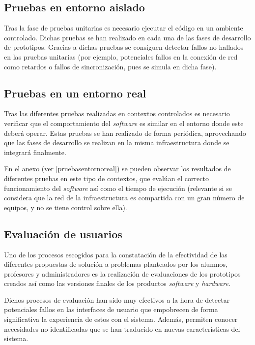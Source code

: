 \subsection{Pruebas en entorno aislado}

Tras la fase de pruebas unitarias es necesario ejecutar el código en un ambiente controlado. Dichas pruebas se han realizado en cada una de las fases de desarrollo de prototipos. Gracias a dichas pruebas se consiguen detectar fallos no hallados en las pruebas unitarias (por ejemplo, potenciales fallos en la conexión de red como retardos o fallos de sincronización, pues se simula en dicha fase).

\subsection{Pruebas en un entorno real}

Tras las diferentes pruebas realizadas en contextos controlados es necesario verificar que el comportamiento del \textit{software} es similar en el entorno donde este deberá operar. Estas pruebas se han realizado de forma periódica, aprovechando que las fases de desarrollo se realizan en la misma infraestructura donde se integrará finalmente.

En el anexo  (ver \ref{pruebasentornoreal}) se pueden observar los resultados de diferentes pruebas en este tipo de contextos, que evalúan el correcto funcionamiento del \textit{software} así como el tiempo de ejecución (relevante si se considera que la red de la infraestructura es compartida con un gran número de equipos, y no se tiene control sobre ella).

\subsection{Evaluación de usuarios}

Uno de los procesos escogidos para la constatación de la efectividad de las diferentes propuestas de solución a problemas planteados por los alumnos, profesores y administradores es la realización de evaluaciones de los prototipos creados así como las versiones finales de los productos \textit{software} y \textit{hardware}.

Dichos procesos de evaluación han sido muy efectivos a la hora de detectar potenciales fallos en las interfaces de usuario que empobrecen de forma significativa la experiencia de estos con el sistema. Además, permiten conocer necesidades no identificadas que se han traducido en nuevas características del sistema.

